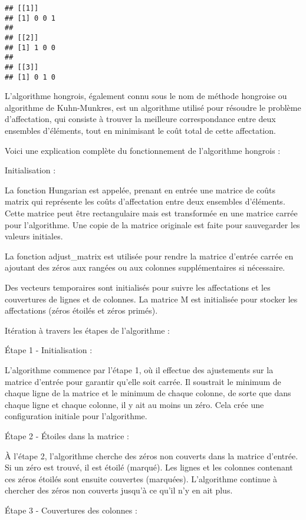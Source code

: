 \documentclass[
]{article}
\begin{document}
\begin{verbatim}
## [[1]]
## [1] 0 0 1
## 
## [[2]]
## [1] 1 0 0
## 
## [[3]]
## [1] 0 1 0
\end{verbatim}

L'algorithme hongrois, également connu sous le nom de méthode hongroise
ou algorithme de Kuhn-Munkres, est un algorithme utilisé pour résoudre
le problème d'affectation, qui consiste à trouver la meilleure
correspondance entre deux ensembles d'éléments, tout en minimisant le
coût total de cette affectation.

Voici une explication complète du fonctionnement de l'algorithme
hongrois :

Initialisation :

La fonction Hungarian est appelée, prenant en entrée une matrice de
coûts matrix qui représente les coûts d'affectation entre deux ensembles
d'éléments. Cette matrice peut être rectangulaire mais est transformée
en une matrice carrée pour l'algorithme. Une copie de la matrice
originale est faite pour sauvegarder les valeurs initiales.

La fonction adjust\_matrix est utilisée pour rendre la matrice d'entrée
carrée en ajoutant des zéros aux rangées ou aux colonnes supplémentaires
si nécessaire.

Des vecteurs temporaires sont initialisés pour suivre les affectations
et les couvertures de lignes et de colonnes. La matrice M est
initialisée pour stocker les affectations (zéros étoilés et zéros
primés).

Itération à travers les étapes de l'algorithme :

Étape 1 - Initialisation :

L'algorithme commence par l'étape 1, où il effectue des ajustements sur
la matrice d'entrée pour garantir qu'elle soit carrée. Il soustrait le
minimum de chaque ligne de la matrice et le minimum de chaque colonne,
de sorte que dans chaque ligne et chaque colonne, il y ait au moins un
zéro. Cela crée une configuration initiale pour l'algorithme.

Étape 2 - Étoiles dans la matrice :

À l'étape 2, l'algorithme cherche des zéros non couverts dans la matrice
d'entrée. Si un zéro est trouvé, il est étoilé (marqué). Les lignes et
les colonnes contenant ces zéros étoilés sont ensuite couvertes
(marquées). L'algorithme continue à chercher des zéros non couverts
jusqu'à ce qu'il n'y en ait plus.

Étape 3 - Couvertures des colonnes :
\end{document}
